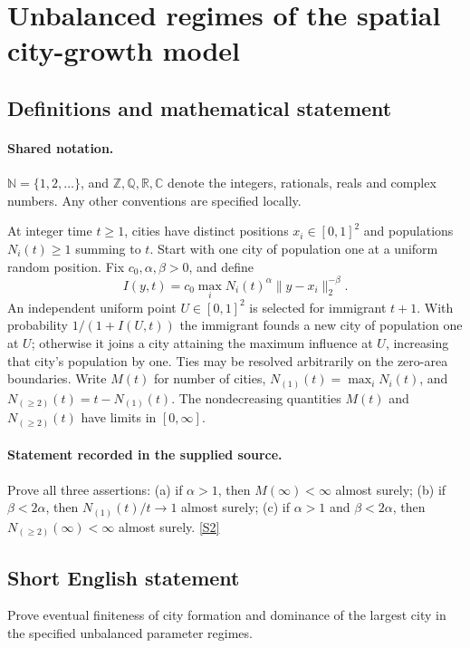 \documentclass[11pt]{article}
\newcommand{\sref}[2]{\hyperlink{source:#1:#2}{[S#2]}}
\begin{document}
\section{Unbalanced regimes of the spatial city-growth model}\label{statement}

\subsection{Definitions and mathematical statement}

\paragraph{Shared notation.}$\mathbb N=\{1,2,\ldots\}$, and $\mathbb Z,\mathbb Q,\mathbb R,\mathbb C$ denote the integers, rationals, reals and complex numbers. Any other conventions are specified locally.


At integer time $t\ge1$, cities have distinct positions $x_i\in[0,1]^2$ and populations $N_i(t)\ge1$ summing to $t$. Start with one city of population one at a uniform random position. Fix $c_0,\alpha,\beta>0$, and define
\[I(y,t)=c_0\max_i N_i(t)^\alpha\|y-x_i\|_2^{-\beta}.\]
An independent uniform point $U\in[0,1]^2$ is selected for immigrant $t+1$. With probability $1/(1+I(U,t))$ the immigrant founds a new city of population one at $U$; otherwise it joins a city attaining the maximum influence at $U$, increasing that city's population by one. Ties may be resolved arbitrarily on the zero-area boundaries. Write $M(t)$ for number of cities, $N_{(1)}(t)=\max_iN_i(t)$, and $N_{(\ge2)}(t)=t-N_{(1)}(t)$. The nondecreasing quantities $M(t)$ and $N_{(\ge2)}(t)$ have limits in $[0,\infty]$.
\paragraph{Statement recorded in the supplied source.}
Prove all three assertions: (a) if $\alpha>1$, then $M(\infty)<\infty$ almost surely; (b) if $\beta<2\alpha$, then $N_{(1)}(t)/t\to1$ almost surely; (c) if $\alpha>1$ and $\beta<2\alpha$, then $N_{(\ge2)}(\infty)<\infty$ almost surely. \sref{statement}{2}
\subsection{Short English statement}
Prove eventual finiteness of city formation and dominance of the largest city in the specified unbalanced parameter regimes.
\end{document}

